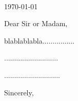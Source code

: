\documentclass[11pt,a4paper]{letter} %
\def\opening#1{\thispagestyle{empty}
{\centering\fromaddress \vspace{1.3in} \\ %
\hspace*{\longindentation}\hfill\today\hspace*{\fill}\par} %
{\raggedright \toaddress \par} %
\vspace{0.2in} %
\noindent #1 %
}
\begin{document}

\begin{letter}



\opening{Dear Sir or Madam,}

blablablabla................

...........................

............................

\closing{Sincerely,}


\end{letter}
\end{document}
